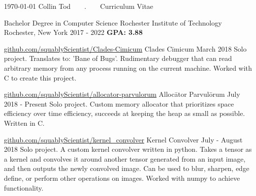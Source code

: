 \documentclass{awesome-cv}
\begin{document}
	\makecvheader[C]

	\makecvfooter
		{\today}
		{Collin Tod~~~~.~~~~Curriculum Vitae}
		{}

		\begin{cventries}
			\cventry
				{Bachelor Degree in Computer Science}
				{Rochester Institute of Technology}
				{Rochester, New York}
				{2017 - 2022}
                {\textbf{GPA: 3.88}}
		\end{cventries}

	\cvsection{PROJECTS}
		\begin{cventries}
			\cventry
				{\href{https://github.com/squablyScientist/Clades-Cimicum}{github.com/squablyScientist/Clades-Cimicum}}
				{Clades Cīmicum}
				{March 2018}
				{}
				{Solo project. Translates to: 'Bane of Bugs'. Rudimentary debugger that can read arbitrary memory from any process running on the current machine. Worked with C to create this project.}

			\cventry
				{\href{https://github.com/squablyScientist/allocator-parvulorum}{github.com/squablyScientist/allocator-parvulorum}}
				{Allocātor Parvulōrum}
				{July 2018 - Present}
				{}
				{Solo project. Custom memory allocator that prioritizes space efficiency over time efficiency, succeeds at keeping the heap as small as possible. Written in C.}

            \cventry
                {\href{https://github.com/squablyScientist/kernel_convolver}{github.com/squablyScientist/kernel\_convolver}}
                {Kernel Convolver}
                {July - August 2018}
                {}
                {Solo project. A custom kernel convolver written in python. Takes a tensor as a kernel and convolves it around another tensor generated from an input image, and then outputs the newly convolved image. Can be used to blur, sharpen, edge define, or perform other operations on images. Worked with numpy to achieve functionality.}


		\end{cventries}
\end{document}
